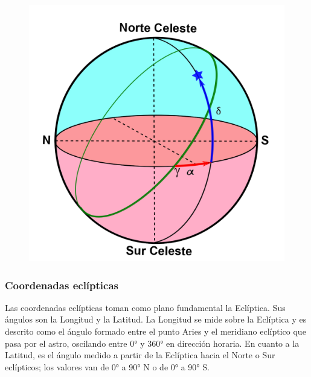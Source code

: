 \documentclass[10pt,a4paper]{article}
\begin{document}
\begin{figure}[H]
\centering
\includegraphics[scale=0.3]{Imagenes/C_Ecua_Abs_01}
\end{figure}

\subsubsection{Coordenadas eclípticas}
Las coordenadas eclípticas toman como plano fundamental la Eclíptica. Sus ángulos son la Longitud y la Latitud. La Longitud se mide sobre la Eclíptica y es descrito como el ángulo formado entre el punto Aries y el meridiano eclíptico que pasa por el astro, oscilando entre 0° y 360° en dirección horaria. En cuanto a la Latitud, es el ángulo medido a partir de la Eclíptica hacia el Norte o Sur eclípticos; los valores van de 0° a 90° N o de 0° a 90° S.
\end{document}
